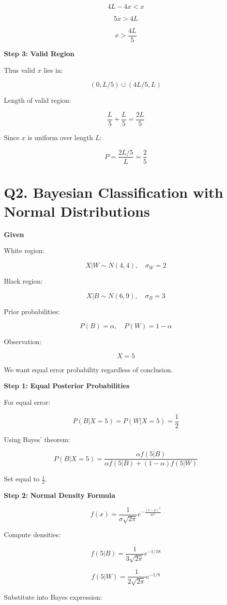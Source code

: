 \documentclass[11pt]{article}
\begin{document}
\[
4L - 4x < x
\]

\[
5x > 4L
\]

\[
x > \frac{4L}{5}
\]

\textbf{Step 3: Valid Region}

Thus valid $x$ lies in:

\[
(0,L/5) \cup (4L/5,L)
\]

Length of valid region:

\[
\frac{L}{5} + \frac{L}{5} = \frac{2L}{5}
\]

Since $x$ is uniform over length $L$:

\[
P = \frac{2L/5}{L} = \frac{2}{5}
\]

\section*{Q2. Bayesian Classification with Normal Distributions}

\textbf{Given}

White region:

\[
X|W \sim N(4,4), \quad \sigma_W = 2
\]

Black region:

\[
X|B \sim N(6,9), \quad \sigma_B = 3
\]

Prior probabilities:

\[
P(B)=\alpha,\quad P(W)=1-\alpha
\]

Observation:

\[
X=5
\]

We want equal error probability regardless of conclusion.

\textbf{Step 1: Equal Posterior Probabilities}

For equal error:

\[
P(B|X=5)=P(W|X=5)=\frac{1}{2}
\]

Using Bayes’ theorem:

\[
P(B|X=5)=\frac{\alpha f(5|B)}{\alpha f(5|B)+(1-\alpha)f(5|W)}
\]

Set equal to $\frac{1}{2}$.

\textbf{Step 2: Normal Density Formula}

\[
f(x)=\frac{1}{\sigma\sqrt{2\pi}}e^{-\frac{(x-\mu)^2}{2\sigma^2}}
\]

Compute densities:

\[
f(5|B)=\frac{1}{3\sqrt{2\pi}}e^{-1/18}
\]

\[
f(5|W)=\frac{1}{2\sqrt{2\pi}}e^{-1/8}
\]

Substitute into Bayes expression:
\end{document}

